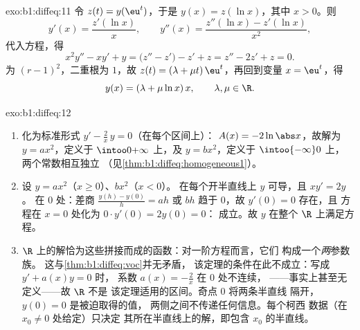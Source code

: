\begin{solution}{exo:b1:diffeq:11}
令 $z(t) = y(\eu^t)$，于是 $y(x) = z(\ln x)$，其中 $x > 0$。则
\[
y'(x) = \frac{z'(\ln x)}x,
\qquad
y''(x) = \frac{z''(\ln x) - z'(\ln x)}{x^2} ,
\]
代入方程，得
\[
x^2y'' - xy' + y = \bigl(z'' - z'\bigr) - z' + z
= z'' - 2z' + z = 0 .
\]
为 $(r - 1)^2$，二重根为 $1$，故 $z(t) =
(\lambda + \mu t)\,\eu^t$，再回到变量 $x = \eu^t$，得
\[
y(x) = (\lambda + \mu\ln x)\,x,
\qquad \lambda, \mu \in \R .
\]
\end{solution}

\begin{solution}{exo:b1:diffeq:12}
\begin{enumerate}
  \item 化为标准形式 $y' - \frac2x\,y = 0$（在每个区间上）：
        $A(x) = -2\ln\abs x$，故解为 $y = a x^2$，定义于
        $\intoo0{+\infty}$ 上，及 $y = b x^2$，定义于 $\intoo{-\infty}0$ 上，
        两个常数相互独立
        （见\cref{thm:b1:diffeq:homogeneous1}）。
  \item 设 $y = ax^2$（$x \geq 0$）、$bx^2$（$x < 0$）。
        在每个开半直线上 $y$ 可导，且 $xy' = 2y$。
        在 $0$ 处：差商 $\frac{y(h) - y(0)}h =
        ah$ 或 $bh$ 趋于 $0$，故 $y'(0) = 0$ 存在，且
        方程在 $x = 0$ 处化为 $0 \cdot y'(0) = 2y(0) = 0$：
        成立。故 $y$ 在整个 $\R$ 上满足方程。
  \item $\R$ 上的解恰为这些拼接而成的函数：对一阶方程而言，它们
        构成一个\emph{两}参数族。
        这与\cref{thm:b1:diffeq:voc}并无矛盾，
        该定理的条件在此不成立：写成 $y' + a(x)y = 0$ 时，
        系数 $a(x) = -\frac2x$ 在 $0$ 处不连续，
——事实上甚至无定义——故 $\R$ 不是
        该定理适用的区间。奇点 $0$ 将两条半直线
        隔开，$y(0) = 0$ 是被迫取得的值，
        两侧之间不传递任何信息。每个柯西
        数据（在 $x_0 \neq 0$ 处给定）只决定
        其所在半直线上的解，即包含 $x_0$ 的半直线。
\end{enumerate}
\end{solution}

